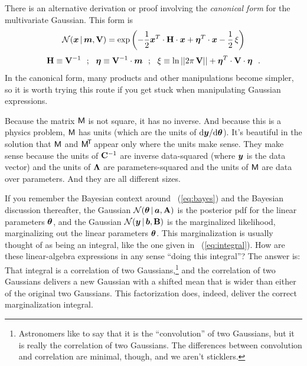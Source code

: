 There is an alternative derivation or proof involving the
\textsl{canonical form} for the multivariate Gaussian. This form is
\begin{equation}
\mathcal{N}\!\,(\boldsymbol{x}\,|\,\boldsymbol{m},\mathbf{V}) = \exp\left(-\frac{1}{2}\boldsymbol{x}^T \cdot\mathbf{H} \cdot \boldsymbol{x} + \boldsymbol{\eta}^T \cdot \boldsymbol{x} - \frac{1}{2}\,\xi\right)
\end{equation}
\begin{equation}
\mathbf{H}\equiv\mathbf{V}^{-1} ~~;~~
\boldsymbol{\eta}\equiv\mathbf{V}^{-1}\cdot\boldsymbol{m} ~~;~~
\xi\equiv\ln||2\pi\,\mathbf{V}||+\boldsymbol{\eta}^T\cdot\mathbf{V}\cdot\boldsymbol{\eta} ~~.
\end{equation}
In the canonical form, many products and other manipulations become simpler, so
it is worth trying this route if you get stuck when manipulating Gaussian
expressions.

Because the matrix $\mathsf{M}$ is not square, it has no inverse. And because this
is a physics problem, $\mathsf{M}$ has units (which are the units of
$\mathrm{d}\boldsymbol{y}/\mathrm{d}\boldsymbol{\theta}$).
It's beautiful in the solution that $\mathsf{M}$ and $\mathsf{M}^{\!\mathsf{T}\!}$ appear only where the
units make sense.
They make sense because the units of $\mathbf{C}^{-1}$ are inverse data-squared (where $\boldsymbol{y}$
is the data vector) and the units of $\mathbf{\Lambda}$ are parameters-squared and the units
of $\mathsf{M}$ are data over parameters.
And they are all different sizes.

If you remember the Bayesian context around \equationname~(\ref{eq:bayes}) and the
Bayesian discussion thereafter,
the Gaussian $\mathcal{N}\!\,(\boldsymbol{\theta}\,|\,\boldsymbol{a},\mathbf{A})$ is the posterior pdf for the linear
parameters $\boldsymbol{\theta}$, and the Gaussian $\mathcal{N}\!\,(\boldsymbol{y}\,|\,\boldsymbol{b},\mathbf{B})$ is the
marginalized likelihood, marginalizing out the linear parameters $\boldsymbol{\theta}$.
This marginalization is usually thought of as being an integral, like the
one given in \equationname~(\ref{eq:integral}).
How are these linear-algebra expressions in any sense ``doing this integral''?
The answer is: That integral is a correlation of two Gaussians,\footnote{Astronomers
  like to say that it is the ``convolution'' of two Gaussians, but it is really the
  correlation of two Gaussians. The differences between convolution and correlation
  are minimal, though, and we aren't sticklers.} and the correlation of two
Gaussians delivers a new Gaussian with a shifted mean that is wider than either
of the original two Gaussians.
This factorization does, indeed, deliver the correct marginalization integral.


